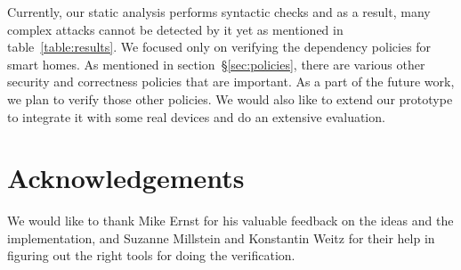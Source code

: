 \documentclass{article}
\begin{document}
Currently, our static analysis performs syntactic checks and as a result, many complex attacks cannot be detected by it yet as mentioned in table~\ref{table:results}. 
We focused only on verifying the dependency policies for smart homes. As mentioned in section~\S\ref{sec:policies}, there are various other security and correctness policies that are important. As a part of the future work, we plan to verify those other policies. We would also like to extend our prototype to integrate it with some real devices and do an extensive evaluation.
\section{Acknowledgements}
We would like to thank Mike Ernst for his valuable feedback on the ideas and the implementation, and Suzanne Millstein and Konstantin Weitz for their help in figuring out the right tools for doing the verification.


\end{document}
